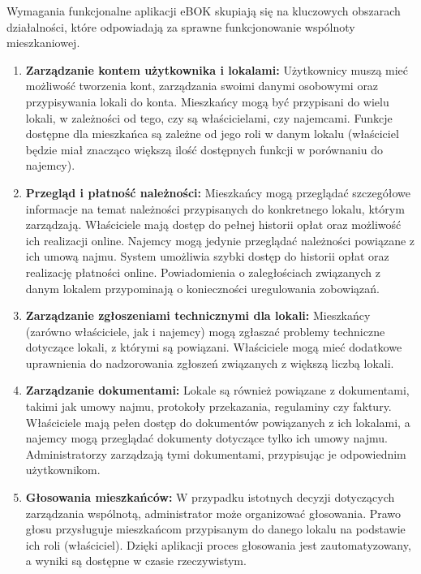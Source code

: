 Wymagania funkcjonalne aplikacji eBOK skupiają się na kluczowych obszarach działalności, które odpowiadają za sprawne funkcjonowanie wspólnoty mieszkaniowej.

\begin{enumerate}[label=\arabic*.]

	\item \textbf{Zarządzanie kontem użytkownika i lokalami:} Użytkownicy muszą mieć możliwość tworzenia kont, zarządzania swoimi danymi osobowymi oraz przypisywania lokali do konta. Mieszkańcy mogą być przypisani do wielu lokali, w zależności od tego, czy są właścicielami, czy najemcami. Funkcje dostępne dla mieszkańca są zależne od jego roli w danym lokalu (właściciel będzie miał znacząco większą ilość dostępnych funkcji w porównaniu do najemcy).

	\item \textbf{Przegląd i płatność należności:} Mieszkańcy mogą przeglądać szczegółowe informacje na temat należności przypisanych do konkretnego lokalu, którym zarządzają. Właściciele mają dostęp do pełnej historii opłat oraz możliwość ich realizacji online. Najemcy mogą jedynie przeglądać należności powiązane z ich umową najmu. System umożliwia szybki dostęp do historii opłat oraz realizację płatności online. Powiadomienia o zaległościach związanych z danym lokalem przypominają o konieczności uregulowania zobowiązań.

	\item \textbf{Zarządzanie zgłoszeniami technicznymi dla lokali:} Mieszkańcy (zarówno właściciele, jak i najemcy) mogą zgłaszać problemy techniczne dotyczące lokali, z którymi są powiązani. Właściciele mogą mieć dodatkowe uprawnienia do nadzorowania zgłoszeń związanych z większą liczbą lokali.

	\item \textbf{Zarządzanie dokumentami:} Lokale są również powiązane z dokumentami, takimi jak umowy najmu, protokoły przekazania, regulaminy czy faktury. Właściciele mają pełen dostęp do dokumentów powiązanych z ich lokalami, a najemcy mogą przeglądać dokumenty dotyczące tylko ich umowy najmu. Administratorzy zarządzają tymi dokumentami, przypisując je odpowiednim użytkownikom.

	\item \textbf{Głosowania mieszkańców:} W przypadku istotnych decyzji dotyczących zarządzania wspólnotą, administrator może organizować głosowania. Prawo głosu przysługuje mieszkańcom przypisanym do danego lokalu na podstawie ich roli (właściciel). Dzięki aplikacji proces głosowania jest zautomatyzowany, a wyniki są dostępne w czasie rzeczywistym.


\end{enumerate}
